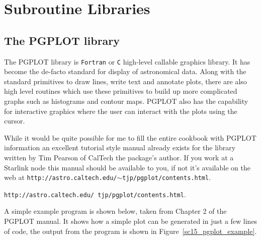 \documentclass[twoside,11pt]{article}
\newcommand{\htmladdnormallink}[2]{#1}
\newcommand{\latex}[1]{#1}
\newcommand{\xlabel}[1]{}
\begin{document}
\section{\xlabel{sc15_libraries}Subroutine Libraries\label{sc15_libraries}}

\subsection{\xlabel{sc15_pgplot}The PGPLOT library\label{sc15_pgplot}}

The \htmladdnormallink{PGPLOT}{http://astro.caltech.edu/~tjp/pgplot/index.html} library is {\tt Fortran} or {\tt C} high-level callable graphics library. It has become the de-facto standard for display of astronomical data. Along with the standard primitives to draw lines, write text and annotate plots, there are also high level routines which use these primitives to build up more complicated graphs such as histograms and contour maps. PGPLOT also has the capability for interactive graphics where the user can interact with the plots using the cursor.

While it would be quite possible for me to fill the entire cookbook with PGPLOT information an excellent tutorial style manual already exists for the library written by \htmladdnormallink{Tim Pearson}{mailto:tjp@astro.caltech.edu} of CalTech the package's author. If you work at a Starlink node this manual should be available to you, if not it's available on the web at \latex{{\tt http://astro.caltech.edu/$\sim$tjp/pgplot/contents.html}.}
\begin{htmlonly}
\htmladdnormallink{{\tt http://astro.caltech.edu/~tjp/pgplot/contents.html}}{http://astro.caltech.edu/~tjp/pgplot/contents.html}.
\end{htmlonly}

A simple example program is shown below, taken from \htmladdnormallink{Chapter 2}{http://astro.caltech.edu/~tjp/pgplot/chapter2.html} of the PGPLOT manual. It shows how a simple plot can be generated in just a few lines of code, the output from the program is shown in Figure~\ref{sc15_pgplot_example}.
\end{document}
